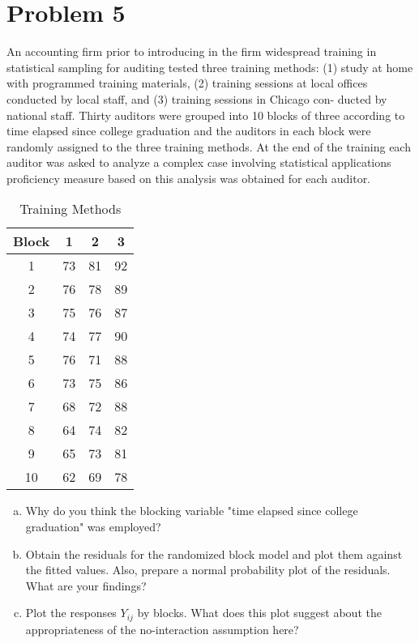 \documentclass{article}
\begin{document}
\section{Problem 5}
An accounting firm prior to introducing in the firm widespread training in statistical sampling
for auditing tested three training methods: (1) study at home with programmed training materials,
(2) training sessions at local offices conducted by local staff, and (3) training sessions in Chicago con-
ducted by national staff. Thirty auditors were grouped into 10 blocks of three according to time elapsed
since college graduation and the auditors in each block were randomly assigned to the three training
methods. At the end of the training each auditor was asked to analyze a complex case involving statistical
applications proficiency measure based on this analysis was obtained for each auditor.
\begin{table}[ht]
	\centering
	\caption{Training Methods}
	\begin{tabular}{|c|c|c|c|}
		\hline
		\textbf{Block} & \textbf{1} & \textbf{2} & \textbf{3} \\
		\hline
		1              & 73         & 81         & 92         \\
		2              & 76         & 78         & 89         \\
		3              & 75         & 76         & 87         \\
		4              & 74         & 77         & 90         \\
		5              & 76         & 71         & 88         \\
		6              & 73         & 75         & 86         \\
		7              & 68         & 72         & 88         \\
		8              & 64         & 74         & 82         \\
		9              & 65         & 73         & 81         \\
		10             & 62         & 69         & 78         \\
		\hline
	\end{tabular}
\end{table}
\pagebreak
\begin{enumerate}[(a)]
	\item Why do you think the blocking variable "time elapsed since college graduation" was employed?
	\item  Obtain the residuals for the randomized block model and plot them against the fitted values. Also, prepare a normal probability plot of the residuals. What are your findings?
	\item  Plot the responses $Y_{ij}$ by blocks. What does this plot suggest about the appropriateness of the no-interaction assumption here?
\end{enumerate}
\end{document}
